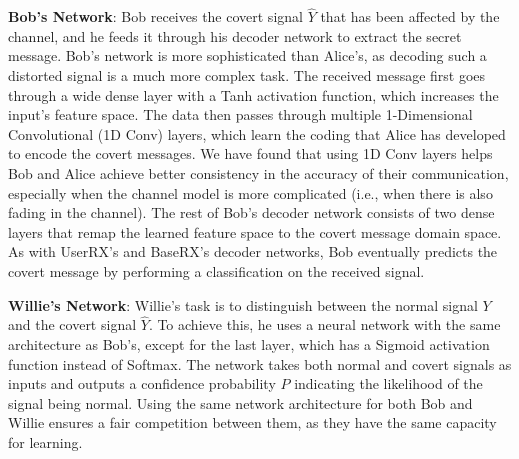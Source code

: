 \textbf{Bob's Network}: Bob receives the covert signal \(\hat{Y}\) that has been affected by the channel, and he feeds it through his decoder network to extract the secret message. Bob's network is more sophisticated than Alice's, as decoding such a distorted signal is a much more complex task. The received message first goes through a wide dense layer with a Tanh activation function, which increases the input's feature space. The data then passes through multiple 1-Dimensional Convolutional (1D Conv) layers, which learn the coding that Alice has developed to encode the covert messages. We have found that using 1D Conv layers helps Bob and Alice achieve better consistency in the accuracy of their communication, especially when the channel model is more complicated (i.e., when there is also fading in the channel). The rest of Bob's decoder network consists of two dense layers that remap the learned feature space to the covert message domain space. As with UserRX's and BaseRX's decoder networks, Bob eventually predicts the covert message by performing a classification on the received signal.


\textbf{Willie's Network}: Willie's task is to distinguish between the normal signal  \(Y\) and the covert  signal \(\hat{Y}\). To achieve this, he uses a neural network with the same architecture as Bob's, except for the last layer, which has a Sigmoid activation function instead of Softmax. The network takes both normal and covert signals as inputs and outputs a confidence probability \(P\) indicating the likelihood of the signal being normal. Using the same network architecture for both Bob and Willie ensures a fair competition between them, as they have the same capacity for learning.